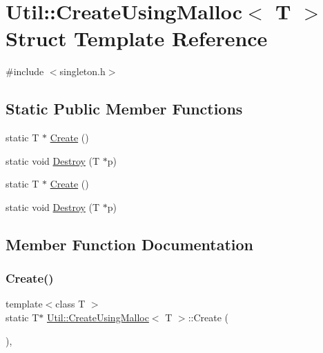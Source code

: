 \hypertarget{structUtil_1_1CreateUsingMalloc}{}\section{Util\+:\+:Create\+Using\+Malloc$<$ T $>$ Struct Template Reference}
\label{structUtil_1_1CreateUsingMalloc}


{\ttfamily \#include $<$singleton.\+h$>$}

\subsection*{Static Public Member Functions}
\begin{DoxyCompactItemize}
\item 
static T $\ast$ \mbox{\hyperlink{structUtil_1_1CreateUsingMalloc_a920efcae7cd097b71fdbc2662c47631f}{Create}} ()
\item 
static void \mbox{\hyperlink{structUtil_1_1CreateUsingMalloc_a8197e99b6560b6b6ee323ec3176698f8}{Destroy}} (T $\ast$p)
\item 
static T $\ast$ \mbox{\hyperlink{structUtil_1_1CreateUsingMalloc_a920efcae7cd097b71fdbc2662c47631f}{Create}} ()
\item 
static void \mbox{\hyperlink{structUtil_1_1CreateUsingMalloc_a8197e99b6560b6b6ee323ec3176698f8}{Destroy}} (T $\ast$p)
\end{DoxyCompactItemize}


\subsection{Member Function Documentation}
\mbox{\label{structUtil_1_1CreateUsingMalloc_a920efcae7cd097b71fdbc2662c47631f}} 
\subsubsection{\texorpdfstring{Create()}{Create()}\hspace{0.1cm}{\footnotesize\ttfamily [1/2]}}
{\footnotesize\ttfamily template$<$class T $>$ \\
static T$\ast$ \mbox{\hyperlink{structUtil_1_1CreateUsingMalloc}{Util\+::\+Create\+Using\+Malloc}}$<$ T $>$\+::Create (\begin{DoxyParamCaption}{ }\end{DoxyParamCaption})\hspace{0.3cm}{\ttfamily [inline]}, {\ttfamily [static]}}

